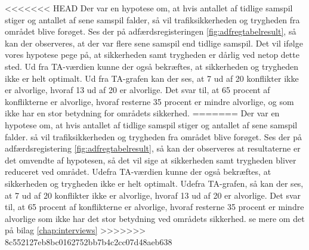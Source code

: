 <<<<<<< HEAD
Der var en hypotese om, at hvis antallet af tidlige samspil stiger og antallet af sene samspil falder, så vil trafiksikkerheden og trygheden fra området blive forøget. Ses der på adfærdsregisteringen \cref{fig:adfregtabelresult}, så kan der observeres, at der var flere sene samspil end tidlige samspil. Det vil ifølge vores hypotese pege på, at sikkerheden samt trygheden er dårlig ved netop dette sted. Ud fra TA-værdien kunne der også bekræftes, at sikkerheden og trygheden ikke er helt optimalt.
Ud fra TA-grafen kan der ses, at 7 ud af 20 konflikter ikke er alvorlige, hvoraf 13 ud af 20 er alvorlige. Det svar til, at 65 procent af konflikterne er alvorlige, hvoraf resterne 35 procent er mindre alvorlige, og som ikke har en stor betydning for områdets sikkerhed.
=======
Der var en hypotese om, at hvis antallet af tidlige samspil stiger og antallet af sene samspil falder. så vil trafiksikkerheden og trygheden fra området blive forøget. Ses der på adfærdsregistering \cref{fig:adfregtabelresult}, så kan der observeres at resultaterne er det omvendte af hypotesen, så det vil sige at sikkerheden samt trygheden bliver reduceret ved området. Udefra TA-værdien kunne der også bekræftes, at sikkerheden og trygheden ikke er helt optimalt.
Udefra TA-grafen, så kan der ses, at 7 ud af 20 konflikter ikke er alvorlige, hvoraf 13 ud af 20 er alvorlige. Det svar til, at 65 procent af konflikterne er alvorlige, hvoraf resterne 35 procent er mindre alvorlige som ikke har det stor betydning ved områdets sikkerhed.
se mere om det på bilag \cref{chap:interviews}
>>>>>>> 8c552127eb8bc0162752bb7b4c2cc07d48aeb638
